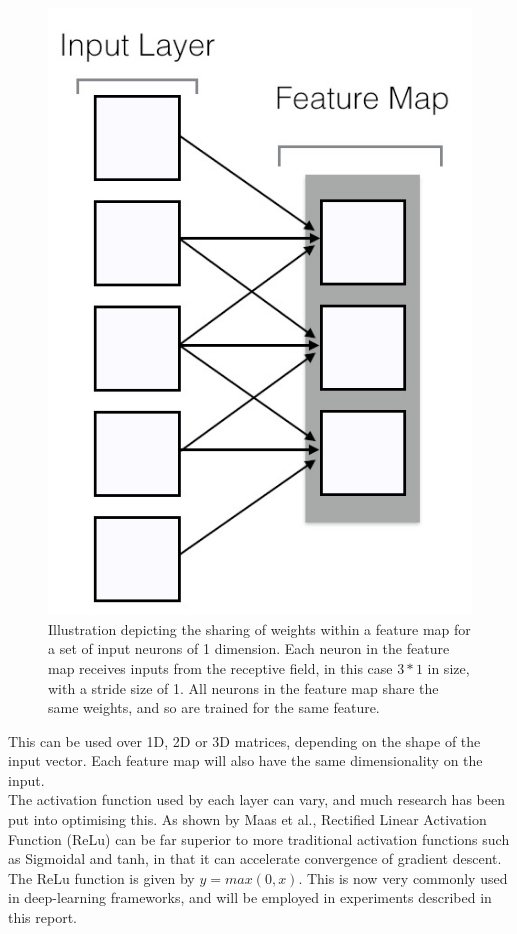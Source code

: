 \documentclass[11pt,a4paper]{memoir}
\numberwithin{figure}{section}
\numberwithin{table}{section}
\numberwithin{equation}{section}
\begin{document}
\begin{figure}[!h]
\centering
\includegraphics[scale=0.25]{WS.jpg}
\caption[Illustration of weight sharing in a convolutional neural network]{Illustration depicting the sharing of weights within a feature map for a set of input neurons of 1 dimension. Each neuron in the feature map receives inputs from the receptive field, in this case $3*1$ in size, with a stride size of 1. All neurons in the feature map share the same weights, and so are trained for the same feature.}
\label{fig:WShare}
\end{figure}

This can be used over 1D, 2D or 3D matrices, depending on the shape of the input vector. Each feature map will also have the same dimensionality on the input.\\

The activation function used by each layer can vary, and much research has been put into optimising this. As shown by Maas et al.\cite{Maas}, Rectified Linear Activation Function (ReLu) can be far superior to more traditional activation functions such as Sigmoidal and tanh, in that it can accelerate convergence of gradient descent. The ReLu function \cite{Maas} is given by $y = max(0, x)$.  This is now very commonly used in deep-learning frameworks, and will be employed in experiments described in this report.
\end{document}
